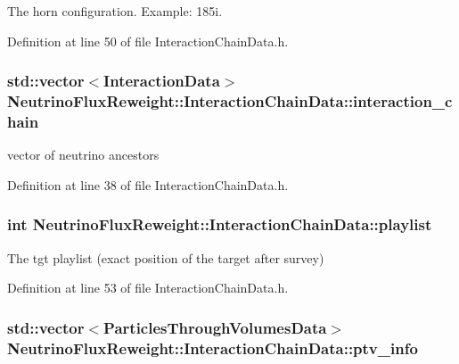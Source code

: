 The horn configuration. Example\-: 185i. 



Definition at line 50 of file Interaction\-Chain\-Data.\-h.

\hypertarget{class_neutrino_flux_reweight_1_1_interaction_chain_data_a5864063b9c20b4f70e4f1e355df21963}{
\subsubsection[{interaction\-\_\-chain}]{\setlength{\rightskip}{0pt plus 5cm}std\-::vector$<${\bf Interaction\-Data}$>$ Neutrino\-Flux\-Reweight\-::\-Interaction\-Chain\-Data\-::interaction\-\_\-chain}}\label{class_neutrino_flux_reweight_1_1_interaction_chain_data_a5864063b9c20b4f70e4f1e355df21963}


vector of neutrino ancestors 



Definition at line 38 of file Interaction\-Chain\-Data.\-h.

\hypertarget{class_neutrino_flux_reweight_1_1_interaction_chain_data_aca185ce4c11a46ea16b29a55ff97a490}{
\subsubsection[{playlist}]{\setlength{\rightskip}{0pt plus 5cm}int Neutrino\-Flux\-Reweight\-::\-Interaction\-Chain\-Data\-::playlist}}\label{class_neutrino_flux_reweight_1_1_interaction_chain_data_aca185ce4c11a46ea16b29a55ff97a490}


The tgt playlist (exact position of the target after survey) 



Definition at line 53 of file Interaction\-Chain\-Data.\-h.

\hypertarget{class_neutrino_flux_reweight_1_1_interaction_chain_data_adda6bc8863579964b62e3d4f51e14926}{
\subsubsection[{ptv\-\_\-info}]{\setlength{\rightskip}{0pt plus 5cm}std\-::vector$<${\bf Particles\-Through\-Volumes\-Data}$>$ Neutrino\-Flux\-Reweight\-::\-Interaction\-Chain\-Data\-::ptv\-\_\-info}}\label{class_neutrino_flux_reweight_1_1_interaction_chain_data_adda6bc8863579964b62e3d4f51e14926}


